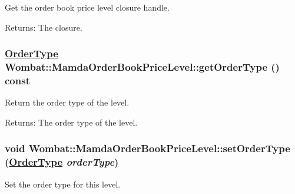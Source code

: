 Get the order book price level closure handle. 

\begin{Desc}
\item[Returns:]The closure. \end{Desc}
\hypertarget{classWombat_1_1MamdaOrderBookPriceLevel_48b2487d645a512f016205f411337edc}{
\subsubsection[getOrderType]{\setlength{\rightskip}{0pt plus 5cm}\hyperlink{classWombat_1_1MamdaOrderBookPriceLevel_7c24238cb240e1d2d86aaa414198c996}{Order\-Type} Wombat::Mamda\-Order\-Book\-Price\-Level::get\-Order\-Type () const}}
\label{classWombat_1_1MamdaOrderBookPriceLevel_48b2487d645a512f016205f411337edc}


Return the order type of the level. 

\begin{Desc}
\item[Returns:]The order type of the level. \end{Desc}
\hypertarget{classWombat_1_1MamdaOrderBookPriceLevel_1a1ed16aa2b724cb8d6c857ac28239f3}{
\subsubsection[setOrderType]{\setlength{\rightskip}{0pt plus 5cm}void Wombat::Mamda\-Order\-Book\-Price\-Level::set\-Order\-Type (\hyperlink{classWombat_1_1MamdaOrderBookPriceLevel_7c24238cb240e1d2d86aaa414198c996}{Order\-Type} {\em order\-Type})}}
\label{classWombat_1_1MamdaOrderBookPriceLevel_1a1ed16aa2b724cb8d6c857ac28239f3}


Set the order type for this level. 

